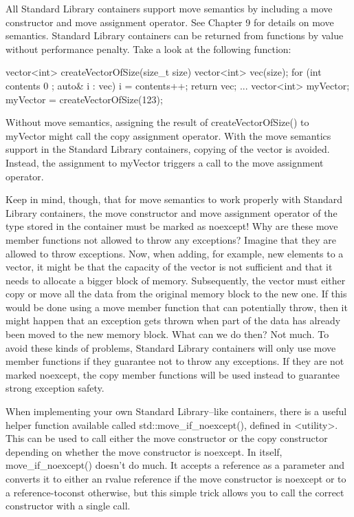 
All Standard Library containers support move semantics by including a move constructor and move assignment operator. See Chapter 9 for details on move semantics. Standard Library containers can be returned from functions by value without performance penalty. Take a look at the following function:

\begin{cpp}
vector<int> createVectorOfSize(size_t size)
{
    vector<int> vec(size);
    for (int contents { 0 }; auto& i : vec) { i = contents++; }
    return vec;
}
...
vector<int> myVector;
myVector = createVectorOfSize(123);
\end{cpp}

Without move semantics, assigning the result of createVectorOfSize() to myVector might call the copy assignment operator. With the move semantics support in the Standard Library containers, copying of the vector is avoided. Instead, the assignment to myVector triggers a call to the move assignment operator.

Keep in mind, though, that for move semantics to work properly with Standard Library containers, the move constructor and move assignment operator of the type stored in the container must be marked as noexcept! Why are these move member functions not allowed to throw any exceptions? Imagine that they are allowed to throw exceptions. Now, when adding, for example, new elements to a vector, it might be that the capacity of the vector is not sufficient and that it needs to allocate a bigger block of memory. Subsequently, the vector must either copy or move all the data from the original memory block to the new one. If this would be done using a move member function that can potentially throw, then it might happen that an exception gets thrown when part of the data has already been moved to the new memory block. What can we do then? Not much. To avoid these kinds of problems, Standard Library containers will only use move member functions if they guarantee not to throw any exceptions. If they are not marked noexcept, the copy member functions will be used instead to guarantee strong exception safety.

When implementing your own Standard Library–like containers, there is a useful helper function available called std::move\_if\_noexcept(), defined in <utility>. This can be used to call either the move constructor or the copy constructor depending on whether the move constructor is noexcept. In itself, move\_if\_noexcept() doesn’t do much. It accepts a reference as a parameter and converts it to either an rvalue reference if the move constructor is noexcept or to a reference-toconst otherwise, but this simple trick allows you to call the correct constructor with a single call.

